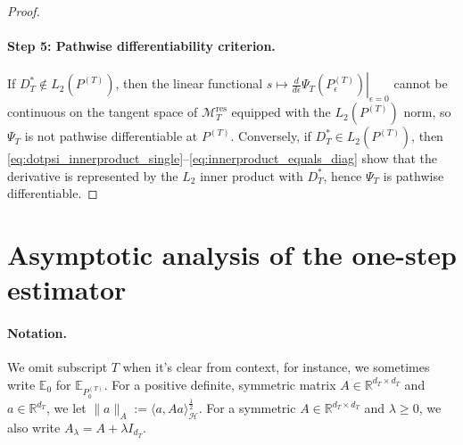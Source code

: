 \documentclass[11pt]{article}
\begin{document}
\begin{proof}
\paragraph{Step 5: Pathwise differentiability criterion.}
If $D^{\ast}_{T}\notin L_2(P^{(T)})$, then the linear functional
$s\mapsto \left.\frac{d}{d\epsilon}\Psi_T(P^{(T)}_\epsilon)\right|_{\epsilon=0}$
cannot be continuous on the tangent space of $\mathcal{M}_T^{\mathrm{res}}$ equipped with the $L_2(P^{(T)})$ norm,
so $\Psi_T$ is not pathwise differentiable at $P^{(T)}$.
Conversely, if $D^{\ast}_{T}\in L_2(P^{(T)})$, then \eqref{eq:dotpsi_innerproduct_single}--\eqref{eq:innerproduct_equals_diag}
show that the derivative is represented by the $L_2$ inner product with $D^{\ast}_{T}$, hence $\Psi_T$ is pathwise differentiable.
\end{proof}


\section{Asymptotic analysis of the one-step estimator}
\label{appendix:one_step_analysis}

\paragraph{Notation.} We omit subscript $T$ when it's clear from context, for instance, we sometimes write $\mathbb{E}_0$ for $\mathbb{E}_{P^{(T)}_0}$. For a positive definite, symmetric matrix $A\in \mathbb{R}^{d_T\times d_T}$ and $a\in \mathbb{R}^{d_T}$, we let $\|a\|_{A}:= \langle a, Aa\rangle^{\frac{1}{2}}_{\mathcal{H}}$. For a symmetric $A \in \mathbb{R}^{d_T\times d_T}$ and $\lambda\geq 0$, we also write $A_{\lambda} = A + \lambda I_{d_T}$. 
\end{document}
